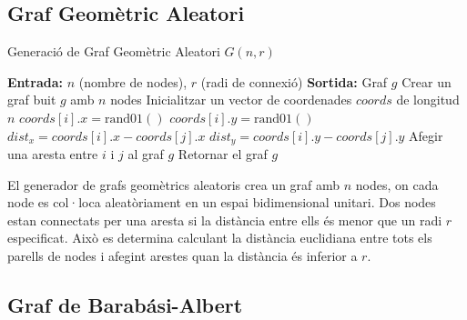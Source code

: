 \documentclass[a4paper]{article}
\begin{document}
	\subsection{Graf Geomètric Aleatori}
	\begin{algorithm} [H]
		\caption{Generació de Graf Geomètric Aleatori $G(n, r)$}
		\begin{algorithmic} [1]
			\Statex \textbf{Entrada:} $n$ (nombre de nodes), $r$ (radi de connexió)
			\Statex \textbf{Sortida:} Graf $g$
			\Statex \vspace{-0.25em}
			\State Crear un graf buit $g$ amb $n$ nodes
			\State Inicialitzar un vector de coordenades $coords$ de longitud $n$
				\State $coords[i].x = \text{rand01}()$
				\State $coords[i].y = \text{rand01}()$
			\EndFor
					\State $dist_x = coords[i].x - coords[j].x$
					\State $dist_y = coords[i].y - coords[j].y$
						\State Afegir una aresta entre $i$ i $j$ al graf $g$
					\EndIf
				\EndFor
			\EndFor
			\State Retornar el graf $g$
		\end{algorithmic}
	\end{algorithm}
	El generador de grafs geomètrics aleatoris crea un graf amb \( n \) nodes, on cada node es col·loca aleatòriament en un espai bidimensional unitari. Dos nodes estan connectats per una aresta si la distància entre ells és menor que un radi \( r \) especificat. Això es determina calculant la distància euclidiana entre tots els parells de nodes i afegint arestes quan la distància és inferior a \( r \).
		
	\subsection{Graf de Barabási-Albert}
\end{document}
